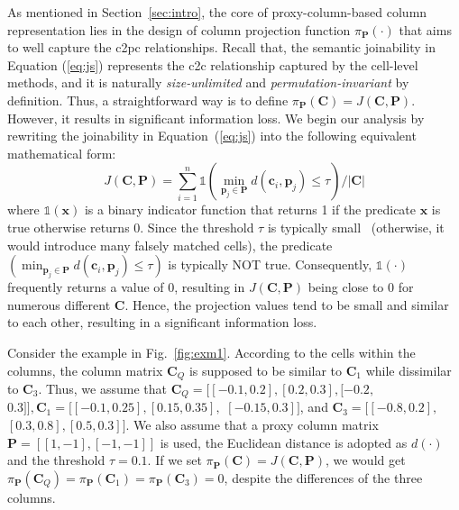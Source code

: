 As mentioned in Section~\ref{sec:intro}, the core of proxy-column-based column representation lies in the design of column projection function  $\pi_{\mathbf{P}}(\cdot)$  that aims to well capture the c2pc relationships. Recall that, the semantic joinability in Equation (\ref{eq:js}) represents the c2c relationship captured by the cell-level methods, and it is naturally \textit{size-unlimited} and \textit{permutation-invariant} by definition. 
Thus, a straightforward way is to define $\pi_{\mathbf{P}}(\mathbf{C}) = J(\mathbf{C}, \mathbf{P})$. However, it results in significant information loss.  We begin our analysis by rewriting the joinability in Equation~(\ref{eq:js}) into the following equivalent  mathematical form:
\begin{equation}
\label{eq:js2}
    J(\mathbf{C}, \mathbf{P})= \sum_{i=1}^n \mathds{1}\left(\min _{\mathbf{p}_j \in \mathbf{P}}  d\left(\mathbf{c}_i, \mathbf{p}_j\right) \leq \tau\right) /|\mathbf{C}|
\end{equation}
\noindent
where $\mathds{1}(\mathbf{x})$ is a binary indicator function that returns 1 if the  predicate $\mathbf{x}$ is true  otherwise returns 0. Since the threshold $\tau$ is typically small~\cite{Pexeso} (otherwise, it would introduce many falsely matched cells), the predicate  $\left(\min _{\mathbf{p}_j \in \mathbf{P}}  d\left(\mathbf{c}_i, \mathbf{p}_j\right)\leq\tau\right)$  is typically NOT true.  Consequently, $\mathds{1}(\cdot)$ frequently returns a value of 0, resulting in $J(\mathbf{C}, \mathbf{P})$ being close to 0 for numerous different $\mathbf{C}$. Hence, the projection values tend to be small and similar to each other, resulting in a significant information loss.
\begin{example}
\label{example-4}
Consider the example in Fig.~\ref{fig:exm1}. According to the cells within the columns,  the column matrix $\mathbf{C}_Q$ is supposed to be similar to $\mathbf{C}_1$ while dissimilar to $\mathbf{C}_3$. Thus, we assume that  $\mathbf{C}_Q = [[-0.1, 0.2], [0.2, 0.3], [-0.2,$ $ 0.3]], \mathbf{C}_1 = [[-0.1, 0.25], [0.15, 0.35], $ $ [-0.15, 0.3]]$, and $\mathbf{C}_3 = [[-0.8, 0.2],$ $[0.3, 0.8], [0.5, 0.3]]$. We also assume that a proxy column matrix $\mathbf{P} = [[1, -1], [-1, -1]]$ is used, the Euclidean distance is adopted as $d(\cdot)$ and the threshold $\tau = 0.1$. If we set $\pi_{\mathbf{P}}(\mathbf{C}) = J(\mathbf{C}, \mathbf{P})$, we would get $\pi_{\mathbf{P}}(\mathbf{C}_Q) = \pi_{\mathbf{P}}(\mathbf{C}_1) = \pi_{\mathbf{P}}(\mathbf{C}_3) = 0$, despite the differences of the three columns.
\end{example}

